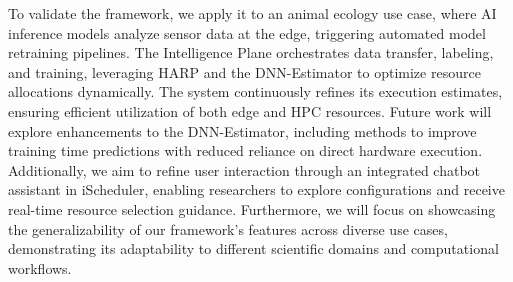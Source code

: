 To validate the framework, we apply it to an animal ecology use case, where AI inference models analyze sensor data at the edge, triggering automated model retraining pipelines. The Intelligence Plane orchestrates data transfer, labeling, and training, leveraging HARP and the DNN-Estimator to optimize resource allocations dynamically. The system continuously refines its execution estimates, ensuring efficient utilization of both edge and HPC resources.
Future work will explore enhancements to the DNN-Estimator, including methods to improve training time predictions with reduced reliance on direct hardware execution. Additionally, we aim to refine user interaction through an integrated chatbot assistant in iScheduler, enabling researchers to explore configurations and receive real-time resource selection guidance. Furthermore, we will focus on showcasing the generalizability of our framework’s features across diverse use cases, demonstrating its adaptability to different scientific domains and computational workflows.

\endinput